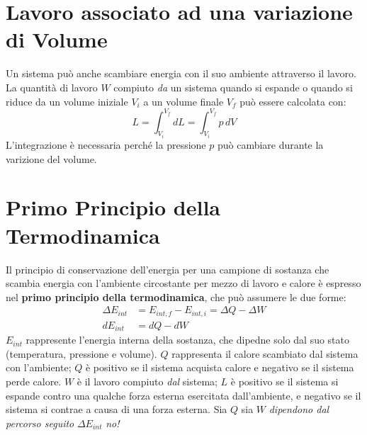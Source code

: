     \section{Lavoro associato ad una variazione di Volume} Un sistema può anche
    scambiare energia con il suo ambiente attraverso il lavoro. La quantità di 
    lavoro $W$ compiuto \textit{da} un sistema quando si espande o quando si 
    riduce da un volume iniziale $V_i$ a un volume finale $V_f$ può essere 
    calcolata con:
        \begin{equation}
            L = \int_{V_i}^{V_f} dL =  \int_{V_i}^{V_f} p \,dV  
        \end{equation}
    L'integrazione è necessaria perché la pressione $p$ può cambiare durante la
    varizione del volume.

    \section{Primo Principio della Termodinamica} Il principio di conservazione
    dell'energia per una campione di sostanza che scambia energia con 
    l'ambiente circostante per mezzo di lavoro e calore è espresso nel \textbf{
    primo principio della termodinamica}, che può assumere le due forme:
        \begin{align}
            \Delta E_{int} &= E_{int, f} - E_{int, i} = \Delta Q - \Delta W \\
            d E_{int} &= d Q - d W
        \end{align}
    $E_{int}$ rappresente l'energia interna della sostanza, che dipedne solo 
    dal suo stato (temperatura, pressione e volume). $Q$ rappresenta il calore
    scambiato dal sistema con l'ambiente; $Q$ è positivo se il sistema acquista
    calore e negativo se il sistema perde calore. $W$ è il lavoro compiuto
    \textit{dal} sistema; $L$ è positivo se il sistema si espande contro una 
    qualche forza esterna esercitata dall'ambiente, e negativo se il sistema si
    contrae a causa di una forza esterna. Sia $Q$ sia $W$ \textit{dipendono dal
    percorso seguito} $\Delta E_{int}$ \textit{no!}

